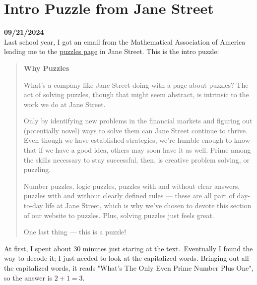 \documentclass[12pt, oneside]{article}
\begin{document}
\section*{Intro Puzzle from Jane Street}
\textbf{09/21/2024}\\
Last school year, I got an email from the Mathematical Association of America leading me to the \href{https://www.janestreet.com/puzzles/}{puzzles page} in Jane Street. This is the intro puzzle:
\begin{quote}
\textbf{Why Puzzles}

What’s a company like Jane Street doing with a page about puzzles? The act of solving puzzles, though that might seem abstract, is intrinsic to the work we do at Jane Street.

Only by identifying new problems in the financial markets and figuring out (potentially novel) ways to solve them can Jane Street continue to thrive. Even though we have established strategies, we’re humble enough to know that if we have a good idea, others may soon have it as well. Prime among the skills necessary to stay successful, then, is creative problem solving, or puzzling.

Number puzzles, logic puzzles, puzzles with and without clear answers, puzzles with and without clearly defined rules — these are all part of day-to-day life at Jane Street, which is why we’ve chosen to devote this section of our website to puzzles. Plus, solving puzzles just feels great.

One last thing — this is a puzzle!
\end{quote}
At first, I spent about 30 minutes just staring at the text.\ Eventually I found the way to decode it; I just needed to look at the capitalized words. Bringing out all the capitalized words, it reads "What's The Only Even Prime Number Plus One", so the answer is $2+1=3$.
\end{document}
